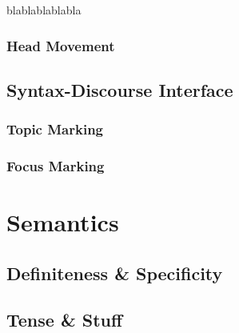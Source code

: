 \documentclass[a4paper,11pt,oneside,openany]{memoir}
\begin{document}
blablablablabla

\subsection{Head Movement}

\section{Syntax-Discourse Interface}

\subsection{Topic Marking}

\subsection{Focus Marking}

\chapter{Semantics}

\section{Definiteness \& Specificity}\label{sec:spec-def}

\section{Tense \& Stuff}\label{sec:tense}





\end{document}
